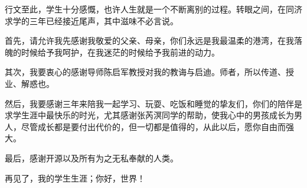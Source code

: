 \begin{ack}\fs
  行文至此，学生十分感慨，也许人生就是一个不断离别的过程。转眼之间，在同济求学的三年已经接近尾声，其中滋味不必言说。

  首先，请允许我先感谢我敬爱的父亲、母亲，你们永远是我最温柔的港湾，在我落魄的时候给予我呵护，在我迷茫的时候给予我前进的动力。

  其次，我要衷心的感谢导师陈启军教授对我的教诲与启迪。师者，所以传道、授业、解惑也。

  然后，我要感谢三年来陪我一起学习、玩耍、吃饭和睡觉的挚友们，你们的陪伴是求学生涯中最快乐的时光，尤其感谢张芮溟同学的帮助，使我心中的男孩成长为男人，尽管成长都是要付出代价的，但一切都是值得的，从此以后，愿你自由而强大。

  最后，感谢开源以及所有为之无私奉献的人类。

  再见了，我的学生生涯；你好，世界！
  
\ackdate
\end{ack}

